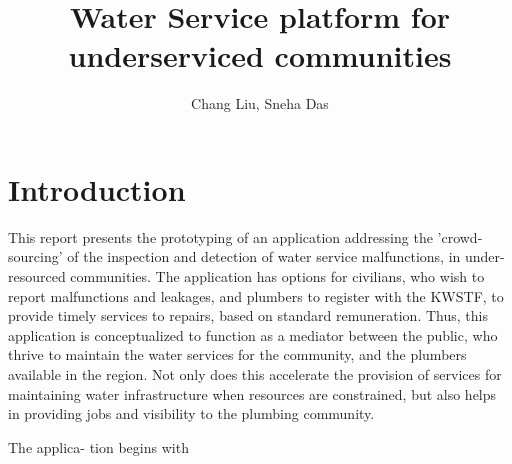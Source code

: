 \documentclass{article}
\title{Water Service platform for underserviced communities}
\author{Chang Liu, Sneha Das}
\begin{document}
\maketitle

\section{Introduction}
This report presents the prototyping of an application addressing the ’crowd-
sourcing’ of the inspection and detection of water service malfunctions, in under-
resourced communities. The application has options for civilians, who wish to
report malfunctions and leakages, and plumbers to register with the KWSTF,
to provide timely services to repairs, based on standard remuneration. Thus,
this application is conceptualized to function as a mediator between the public,
who thrive to maintain the water services for the community, and the plumbers
available in the region. Not only does this accelerate the provision of services
for maintaining water infrastructure when resources are constrained, but also
helps in providing jobs and visibility to the plumbing community.

The applica-
tion begins with \lipsum[2]
\end{document}
